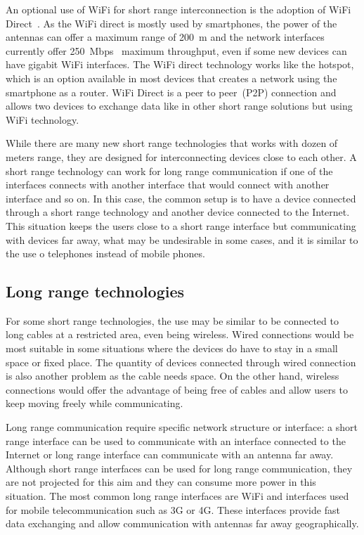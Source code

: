 An optional use of WiFi for short range interconnection is the adoption of WiFi Direct~\citep{Alliance2010wifii}.
As the WiFi direct is mostly used by smartphones, the power of the antennas can offer a maximum range of 200~m and the network interfaces currently offer 250~Mbps~\citep{Feng2014d2d} maximum throughput, even if some new devices can have gigabit WiFi interfaces.
The WiFi direct technology works like the hotspot, which is an option available in most devices that creates a network using the smartphone as a router.
WiFi Direct is a peer to peer~(P2P) connection and allows two devices to exchange data like in other short range solutions but using WiFi technology.

While there are many new short range technologies that works with dozen of meters range, they are designed for interconnecting devices close to each other.
A short range technology can work for long range communication if one of the interfaces connects with another interface that would connect with another interface and so on.
In this case, the common setup is to have a device connected through a short range technology and another device connected to the Internet.
This situation keeps the users close to a short range interface but communicating with devices far away, what may be undesirable in some cases, and it is similar to the use o telephones instead of mobile phones. 

\subsection*{Long range technologies} 

For some short range technologies, the use may be similar to be connected to long cables at a restricted area, even being wireless.
Wired connections would be most suitable in some situations where the devices do have to stay in a small space or fixed place.
The quantity of devices connected through wired connection is also another problem as the cable needs space.
On the other hand, wireless connections would offer the advantage of being free of cables and allow users to keep moving freely while communicating.

Long range communication require specific network structure or interface: a short range interface can be used to communicate with an interface connected to the Internet or long range interface can communicate with an antenna far away.
Although short range interfaces can be used for long range communication, they are not projected for this aim and they can consume more power in this situation.
The most common long range interfaces are WiFi and interfaces used for mobile telecommunication such as 3G or 4G.
These interfaces provide fast data exchanging and allow communication with antennas far away geographically. 

